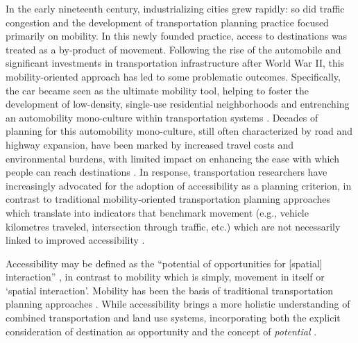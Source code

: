 \documentclass[
  10pt,
  letterpaper,
]{article}
\begin{document}
In the early nineteenth century, industrializing cities grew rapidly: so
did traffic congestion and the development of transportation planning
practice focused primarily on mobility. In this newly founded practice,
access to destinations was treated as a by-product of movement.
Following the rise of the automobile and significant investments in
transportation infrastructure after World War II, this mobility-oriented
approach has led to some problematic outcomes. Specifically, the car
became seen as the ultimate mobility tool, helping to foster the
development of low-density, single-use residential neighborhoods and
entrenching an automobility mono-culture within transportation systems
\citep{miller_collaborative_2011, lavery_driving_2013}. Decades of
planning for this automobility mono-culture, still often characterized
by road and highway expansion, have been marked by increased travel
costs and environmental burdens, with limited impact on enhancing the
ease with which people can reach destinations
\citep{farber_running_2011, handyACCESSIBILITYVSMOBILITYENHANCING2002, paez_healthcare_2010}.
In response, transportation researchers have increasingly advocated for
the adoption of accessibility as a planning criterion, in contrast to
traditional mobility-oriented transportation planning approaches which
translate into indicators that benchmark movement (e.g., vehicle
kilometres traveled, intersection through traffic, etc.) which are not
necessarily linked to improved accessibility
\citep{silvaAccessibilityInstrumentsPlanning2017, paez_developing_2013, handy2020, elgeneidyMakingAccessibilityWork2022}.

Accessibility may be defined as the ``potential of opportunities for
{[}spatial{]} interaction'' \citep{hansen1959}, in contrast to mobility
which is simply, movement in itself or `spatial interaction'. Mobility
has been the basis of traditional transportation planning approaches
\citep{ortuzar_2011_modelling}. While accessibility brings a more
holistic understanding of combined transportation and land use systems,
incorporating both the explicit consideration of destination as
opportunity and the concept of \emph{potential}
\citep{handyMeasuringAccessibilityExploration1997}.
\end{document}
